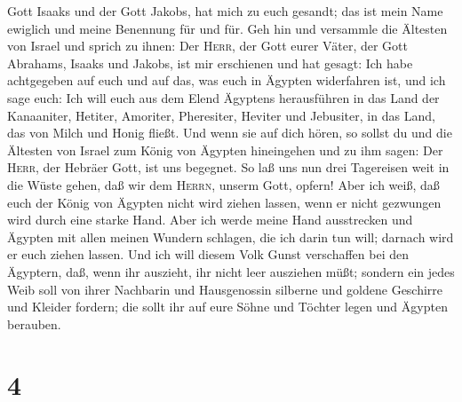 Gott Isaaks und der Gott Jakobs, hat mich zu euch gesandt; das ist mein
Name ewiglich und meine Benennung für und für.  Geh hin
und versammle die Ältesten von Israel und sprich zu ihnen: Der
\textsc{Herr}, der Gott eurer Väter, der Gott Abrahams, Isaaks und
Jakobs, ist mir erschienen und hat gesagt: Ich habe achtgegeben auf euch
und auf das, was euch in Ägypten widerfahren ist,  und
ich sage euch: Ich will euch aus dem Elend Ägyptens herausführen in das
Land der Kanaaniter, Hetiter, Amoriter, Pheresiter, Heviter und
Jebusiter, in das Land, das von Milch und Honig fließt. 
Und wenn sie auf dich hören, so sollst du und die Ältesten von Israel
zum König von Ägypten hineingehen und zu ihm sagen: Der \textsc{Herr},
der Hebräer Gott, ist uns begegnet. So laß uns nun drei Tagereisen weit
in die Wüste gehen, daß wir dem \textsc{Herrn}, unserm Gott, opfern!
 Aber ich weiß, daß euch der König von Ägypten nicht wird
ziehen lassen, wenn er nicht gezwungen wird durch eine starke Hand.
 Aber ich werde meine Hand ausstrecken und Ägypten mit
allen meinen Wundern schlagen, die ich darin tun will; darnach wird er
euch ziehen lassen.  Und ich will diesem Volk Gunst
verschaffen bei den Ägyptern, daß, wenn ihr auszieht, ihr nicht leer
ausziehen müßt;  sondern ein jedes Weib soll von ihrer
Nachbarin und Hausgenossin silberne und goldene Geschirre und Kleider
fordern; die sollt ihr auf eure Söhne und Töchter legen und Ägypten
berauben.

\hypertarget{section-3}{%
\section{4}\label{section-3}}

